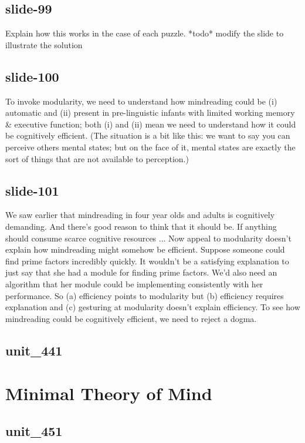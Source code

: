 \documentclass[12pt,\papersize]{extarticle}
\begin{document}
 
\subsection{slide-99}
Explain how this works in the case of each puzzle.
*todo* modify the slide to illustrate the solution
 
 
\subsection{slide-100}
To invoke modularity, we need to understand how mindreading could be (i) automatic and (ii) present in pre-linguistic infants with limited working memory \& executive function; both (i) and (ii) mean we need to understand how it could be cognitively efficient. (The situation is a bit like this: we want to say you can perceive others mental states; but on the face of it, mental states are exactly the sort of things that are not available to perception.)
 
 
\subsection{slide-101}
We saw earlier that mindreading in four year olds and adults is cognitively demanding.
And there's good reason to think that it should be.
If anything should consume scarce cognitive resources ...
Now appeal to modularity doesn't explain how mindreading might somehow be efficient.
Suppose someone could find prime factors incredibly quickly.
It wouldn't be a satisfying explanation to just say that she had a module for finding prime factors.
We'd also need an algorithm that her module could be implementing consistently with her performance.
So (a) efficiency points to modularity but (b) efficiency requires explanation and (c) gesturing at modularity doesn't explain efficiency.
To see how mindreading could be cognitively efficient, we need to reject a dogma.
 
 
\subsection{unit\_441}
 
\section{Minimal Theory of Mind}
 
 
\subsection{unit\_451}
 
\end{document}
